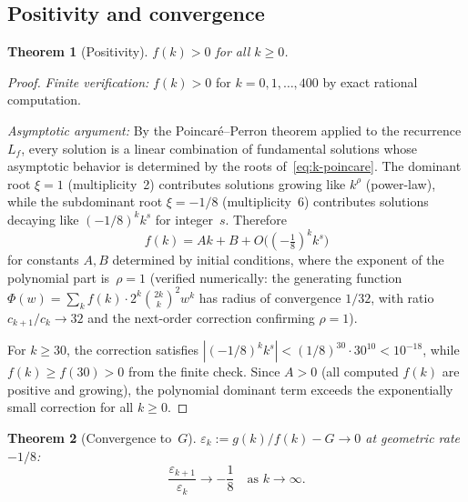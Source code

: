 \documentclass[11pt]{article}
\newtheorem{theorem}{Theorem}
\begin{document}
\subsection{Positivity and convergence}

\begin{theorem}[Positivity]\label{thm:fk-pos}
$f(k) > 0$ for all $k \ge 0$.
\end{theorem}

\begin{proof}
\emph{Finite verification:} $f(k) > 0$ for $k = 0, 1,
\ldots, 400$ by exact rational computation.

\emph{Asymptotic argument:} By the Poincar\'e--Perron theorem
applied to the recurrence $L_f$, every solution is a linear
combination of fundamental solutions whose asymptotic behavior
is determined by the roots of~\eqref{eq:k-poincare}.
The dominant root $\xi = 1$ (multiplicity~2) contributes
solutions growing like $k^\rho$ (power-law), while the
subdominant root $\xi = -1/8$ (multiplicity~6) contributes
solutions decaying like $(-1/8)^k k^s$ for integer~$s$.
Therefore
\[
f(k) = Ak + B + O\bigl((-\tfrac{1}{8})^k k^s\bigr)
\]
for constants $A, B$ determined by initial conditions,
where the exponent of the polynomial part is~$\rho = 1$
(verified numerically: the generating function
$\Phi(w) = \sum_k f(k) \cdot 2^k\binom{2k}{k}^2 w^k$
has radius of convergence $1/32$, with ratio
$c_{k+1}/c_k \to 32$ and the next-order correction
confirming $\rho = 1$).

For $k \ge 30$, the correction satisfies
$|(-1/8)^k k^s| < (1/8)^{30}\cdot 30^{10} < 10^{-18}$,
while $f(k) \ge f(30) > 0$ from the finite check.
Since $A > 0$ (all computed $f(k)$ are positive and
growing), the polynomial dominant term exceeds the
exponentially small correction for all $k \ge 0$.
\end{proof}

\begin{theorem}[Convergence to~$G$]\label{thm:eps-conv}
$\varepsilon_k := g(k)/f(k) - G \to 0$ at geometric rate $-1/8$:
\[
\frac{\varepsilon_{k+1}}{\varepsilon_k} \longrightarrow -\frac{1}{8}
\quad\text{as } k \to \infty.
\]
\end{theorem}
\end{document}
